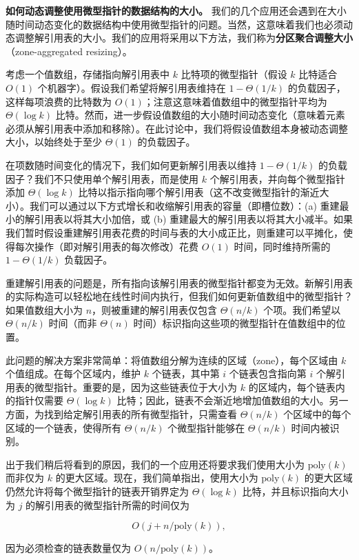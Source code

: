 \documentclass[12pt,a4paper]{ctexart}
\theoremstyle{remark}
\begin{document}
\textbf{如何动态调整使用微型指针的数据结构的大小。} 我们的几个应用还会遇到在大小随时间动态变化的数据结构中使用微型指针的问题。当然，这意味着我们也必须动态调整解引用表的大小。我们的应用将采用以下方法，我们称为\textbf{分区聚合调整大小}（zone-aggregated resizing）。

考虑一个值数组，存储指向解引用表中 $k$ 比特项的微型指针（假设 $k$ 比特适合 $O(1)$ 个机器字）。假设我们希望将解引用表维持在 $1-\Theta(1/k)$ 的负载因子，这样每项浪费的比特数为 $O(1)$；注意这意味着值数组中的微型指针平均为 $\Theta(\log k)$ 比特。然而，进一步假设值数组的大小随时间动态变化（意味着元素必须从解引用表中添加和移除）。在此讨论中，我们将假设值数组本身被动态调整大小，以始终处于至少 $\Theta(1)$ 的负载因子。

在项数随时间变化的情况下，我们如何更新解引用表以维持 $1-\Theta(1/k)$ 的负载因子？我们不只使用单个解引用表，而是使用 $k$ 个解引用表，并向每个微型指针添加 $\Theta(\log k)$ 比特以指示指向哪个解引用表（这不改变微型指针的渐近大小）。我们可以通过以下方式增长和收缩解引用表的容量（即槽位数）：(a) 重建最小的解引用表以将其大小加倍，或 (b) 重建最大的解引用表以将其大小减半。如果我们暂时假设重建解引用表花费的时间与表的大小成正比，则重建可以平摊化，使得每次操作（即对解引用表的每次修改）花费 $O(1)$ 时间，同时维持所需的 $1-\Theta(1/k)$ 负载因子。

重建解引用表的问题是，所有指向该解引用表的微型指针都变为无效。新解引用表的实际构造可以轻松地在线性时间内执行，但我们如何更新值数组中的微型指针？如果值数组大小为 $n$，则被重建的解引用表仅包含 $\Theta(n/k)$ 个项。我们希望以 $\Theta(n/k)$ 时间（而非 $\Theta(n)$ 时间）标识指向这些项的微型指针在值数组中的位置。

此问题的解决方案非常简单：将值数组分解为连续的区域（zone），每个区域由 $k$ 个值组成。在每个区域内，维护 $k$ 个链表，其中第 $i$ 个链表包含指向第 $i$ 个解引用表的微型指针。重要的是，因为这些链表位于大小为 $k$ 的区域内，每个链表内的指针仅需要 $\Theta(\log k)$ 比特；因此，链表不会渐近地增加值数组的大小。另一方面，为找到给定解引用表的所有微型指针，只需查看 $\Theta(n/k)$ 个区域中的每个区域的一个链表，使得所有 $\Theta(n/k)$ 个微型指针能够在 $\Theta(n/k)$ 时间内被识别。

出于我们稍后将看到的原因，我们的一个应用还将要求我们使用大小为 $\text{poly}(k)$ 而非仅为 $k$ 的更大区域。现在，我们简单指出，使用大小为 $\text{poly}(k)$ 的更大区域仍然允许将每个微型指针的链表开销界定为 $\Theta(\log k)$ 比特，并且标识指向大小为 $j$ 的解引用表的微型指针所需的时间仅为

$$O(j+n/\text{poly}(k)),\tag{3}$$

因为必须检查的链表数量仅为 $O(n/\text{poly}(k))$。
\end{document}
